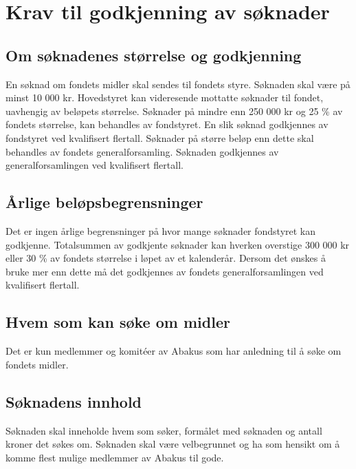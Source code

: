 \section{Krav til godkjenning av søknader}
\subsection{Om søknadenes størrelse og godkjenning}
En søknad om fondets midler skal sendes til fondets styre. Søknaden skal være
på minst 10 000 kr. Hovedstyret kan videresende mottatte søknader til fondet,
uavhengig av beløpets størrelse. Søknader på mindre enn 250 000 kr og 25 \% av
fondets størrelse, kan behandles av fondstyret. En slik søknad godkjennes av
fondstyret ved kvalifisert flertall. Søknader på
større beløp enn dette skal behandles av fondets generalforsamling. Søknaden
godkjennes av generalforsamlingen ved kvalifisert flertall.

\subsection{Årlige beløpsbegrensninger}
Det er ingen årlige begrensninger på hvor mange søknader fondstyret kan
godkjenne. Totalsummen av godkjente søknader kan hverken overstige 300 000 kr
eller 30 \% av fondets størrelse i løpet av et kalenderår. Dersom det ønskes å
bruke mer enn dette må det godkjennes av fondets generalforsamlingen ved
kvalifisert flertall.

\subsection{Hvem som kan søke om midler}
Det er kun medlemmer og komitéer av Abakus som har anledning til å søke om
fondets midler. 

\subsection{Søknadens innhold}
Søknaden skal inneholde hvem som søker, formålet med søknaden og antall kroner
det søkes om. Søknaden skal være velbegrunnet og ha som hensikt om å komme
flest mulige medlemmer av Abakus til gode. 
